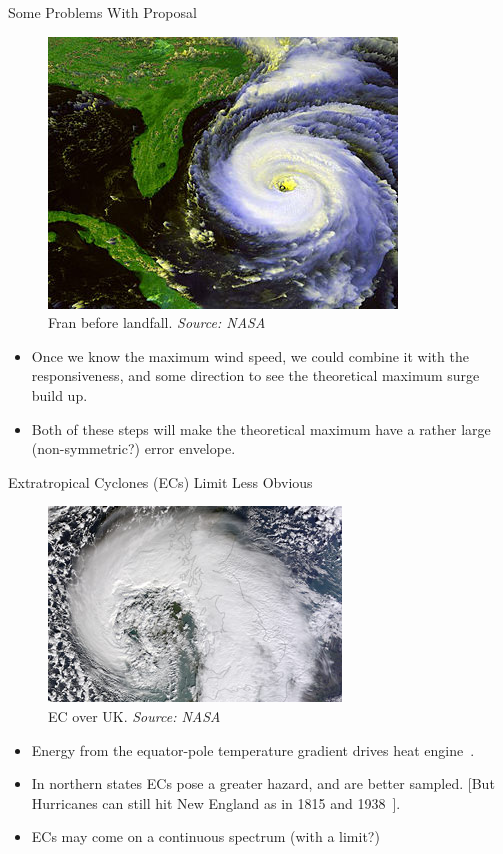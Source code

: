 \begin{frame}{Some Problems With Proposal}
\vspace{-20pt}
\begin{figure}
\includegraphics[width=0.4\linewidth]{images/hurricane_fran.jpg}\\
Fran before landfall. \textit{Source: NASA}
\end{figure}
\begin{itemize}
\item Once we know the maximum wind speed, we could combine it with the responsiveness,
     and some direction to see the theoretical maximum surge build up.
\item Both of these steps will make the theoretical maximum have a rather large
     (non-symmetric?) error envelope.

\end{itemize}
\end{frame}

\begin{frame}{Extratropical Cyclones (ECs) Limit Less Obvious}
\begin{figure}[htb!]
\includegraphics[width=0.4\linewidth]{images/ukstorm_tmo_2014043_tn.jpg}\\
EC over UK. \textit{Source: NASA}
\end{figure}
\begin{itemize}
\item Energy from the equator-pole temperature gradient
      drives heat engine~\cite{lorenz1960energy, holton2004introduction}.
\item In northern states  ECs pose a greater hazard, and are better sampled.
[But Hurricanes can still hit
 New England as in 1815 and 1938~\cite{emanuel2005divine}].
\item ECs may come on a continuous spectrum (with a limit?)
\end{itemize}
\end{frame}

